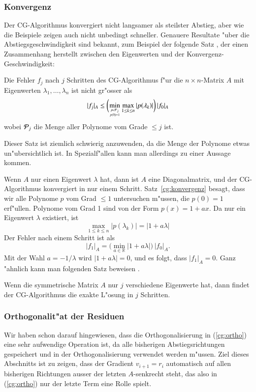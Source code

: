 \subsubsection{Konvergenz}
Der CG-Algorithmus konvergiert nicht langsamer als steilster Abstieg, aber
wie die Beispiele zeigen auch nicht unbedingt schneller.
Genauere Resultate "uber die Abstiegsgeschwindigkeit sind bekannt,
zum Beispiel der folgende Satz \cite[Theorem 8.9.9]{skript:watkins},
der einen Zusammenhang herstellt zwischen den Eigenwerten und der
Konvergenz-Geschwindigkeit:

\begin{satz}
\label{cg:konvergenz}
Die Fehler $f_j$ nach $j$ Schritten des CG-Algorithmus f"ur die
$n\times n$-Matrix $A$
mit Eigenwerten $\lambda_1,\dots,\lambda_n$ ist nicht gr"osser
als
\[
| f_j|_A
\le
\biggl(
\min_{{p\in{\cal P}_j}\atop{p(0)=1}}
\max_{1\le k\le n} |p(\lambda_k)|
\biggr)\,|f_0|_A
\]
wobei ${\cal P}_j$ die Menge aller Polynome vom Grade $\le j$ ist.
\end{satz}

Dieser Satz ist ziemlich schwierig anzuwenden, da die Menge der Polynome
etwas un"ubersichtlich ist.
In Spezialf"allen kann man allerdings zu einer Aussage kommen.

Wenn $A$ nur einen Eigenwert $\lambda$ hat, dann ist $A$ eine Diagonalmatrix,
und der CG-Algorithmus konvergiert in nur einem Schritt.
Satz~\ref{cg:konvergenz} besagt, dass wir alle Polynome $p$ vom Grad
$\le 1$ untersuchen m"ussen, die $p(0)=1$ erf"ullen.
Polynome vom Grad 1 sind von der Form $p(x)=1+ax$.
Da nur ein Eigenwert $\lambda$ existiert, ist 
\[
\max_{1\le k\le n}|p(\lambda_k)|=|1+a\lambda|
\]
Der Fehler nach einem Schritt ist als
\[
|f_1|_A=\bigl(\min_{a\in\mathbb R}|1+a\lambda|\bigr)\,|f_0|_A.
\]
Mit der Wahl $a=-1/\lambda$ wird $|1+a\lambda|=0$, und es folgt, dass
$|f_1|_A=0$.
Ganz "ahnlich kann man folgenden Satz beweisen
\cite[Theorem 8.9.12]{skript:watkins}.

\begin{satz}
Wenn die symmetrische Matrix $A$ nur $j$ verschiedene Eigenwerte hat,
dann findet der CG-Algorithmus die exakte L"osung in $j$ Schritten.
\end{satz}

\subsubsection{Orthogonalit"at der Residuen}
Wir haben schon darauf hingewiesen, dass die Orthogonalisierung in
(\ref{cg:ortho}) eine sehr aufwendige Operation ist, da alle bisherigen
Abstiegsrichtungen gespeichert und in der Orthogonalisierung verwendet
werden m"ussen.
Ziel dieses Abschnitts ist zu zeigen, dass der Gradient
$v_{i+1}=r_i$ automatisch auf allen bisherigen Richtungen
ausser der letzten $A$-senkrecht steht,
das also in (\ref{cg:ortho}) nur der letzte Term eine Rolle spielt.

